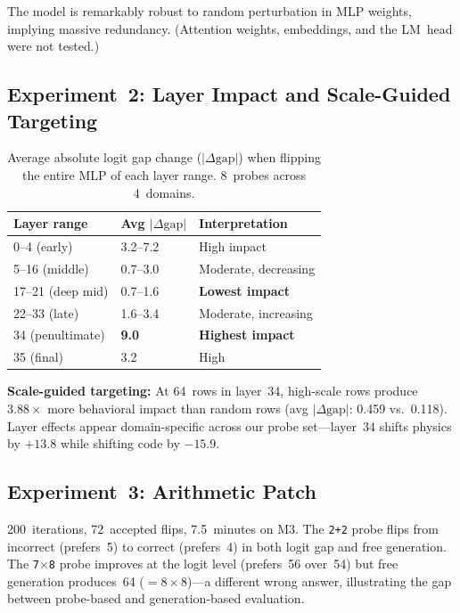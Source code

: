 \documentclass[11pt,a4paper]{article}
\begin{document}
The model is remarkably robust to random perturbation in MLP weights,
implying massive redundancy. (Attention weights, embeddings, and the
LM~head were not tested.)

\subsection{Experiment~2: Layer Impact and Scale-Guided Targeting}

\begin{table}[h]
\centering
\caption{Average absolute logit gap change ($|\Delta\text{gap}|$) when
  flipping the entire MLP of each layer range. 8~probes across 4~domains.}
\begin{tabular}{@{}lll@{}}
\toprule
Layer range & Avg $|\Delta\text{gap}|$ & Interpretation \\
\midrule
0--4 (early)        & 3.2--7.2 & High impact \\
5--16 (middle)      & 0.7--3.0 & Moderate, decreasing \\
17--21 (deep mid)   & 0.7--1.6 & \textbf{Lowest impact} \\
22--33 (late)       & 1.6--3.4 & Moderate, increasing \\
34 (penultimate)    & \textbf{9.0} & \textbf{Highest impact} \\
35 (final)          & 3.2 & High \\
\bottomrule
\end{tabular}
\end{table}

\textbf{Scale-guided targeting:} At 64~rows in layer~34, high-scale
rows produce $3.88\times$ more behavioral impact than random rows
(avg $|\Delta\text{gap}|$: 0.459 vs.\ 0.118). Layer effects appear
domain-specific across our probe set---layer~34 shifts physics by
$+13.8$ while shifting code by $-15.9$.

\subsection{Experiment~3: Arithmetic Patch}

200~iterations, 72~accepted flips, 7.5~minutes on M3. The \texttt{2+2}
probe flips from incorrect (prefers~5) to correct (prefers~4) in both
logit gap and free generation. The \texttt{7$\times$8} probe improves
at the logit level (prefers~56 over~54) but free generation produces~64
($=8\times8$)---a different wrong answer, illustrating the gap between
probe-based and generation-based evaluation.
\end{document}
